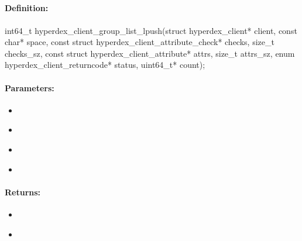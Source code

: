 \pagebreak
\subsection{}
\label{api:c:group_list_lpush}


\paragraph{Definition:}
\begin{ccode}
int64_t hyperdex_client_group_list_lpush(struct hyperdex_client* client,
        const char* space,
        const struct hyperdex_client_attribute_check* checks, size_t checks_sz,
        const struct hyperdex_client_attribute* attrs, size_t attrs_sz,
        enum hyperdex_client_returncode* status,
        uint64_t* count);
\end{ccode}

\paragraph{Parameters:}
\begin{itemize}[noitemsep]
\item {}\\

\item {}\\

\item {}\\

\item {}\\

\end{itemize}

\paragraph{Returns:}
\begin{itemize}[noitemsep]
\item {}\\

\item {}\\

\end{itemize}

